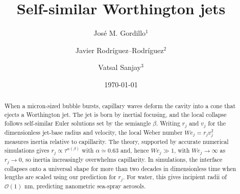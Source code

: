 \documentclass[twocolumn]{revtex4-2}
\begin{document}

\title{Self-similar Worthington jets} %

\author{Jos\'e M. Gordillo$^{1}$}
\author{Javier Rodr\'iguez--Rodr\'{i}guez$^{2}$}%
\author{Vatsal Sanjay$^{3}$}

\date{\today}%

\begin{abstract}
When a micron-sized bubble bursts, capillary waves deform the cavity into a cone that ejects a Worthington jet. The jet is born by inertial focusing, and the local collapse follows self-similar Euler solutions set by the semiangle $\beta$. Writing $r_j$ and $v_j$ for the dimensionless jet-base radius and velocity, the local Weber number $We_j=r_j v^2_j$ measures inertia relative to capillarity. The theory, supported by accurate numerical simulations gives $r_j\propto\tau^{\alpha(\beta)}$ with $\alpha\simeq0.63$ and, hence $We_j\gg1$, with $We_j\to\infty$ as $r_j\to0$, so inertia increasingly overwhelms capillarity. In simulations, the interface collapses onto a universal shape for more than two decades in dimensionless time when lengths are scaled using our prediction for $r_j$. For water, this gives incipient radii of $\mathcal{O}(1)$ nm, predicting nanometric sea-spray aerosols.
\end{abstract}

\maketitle
\end{document}
